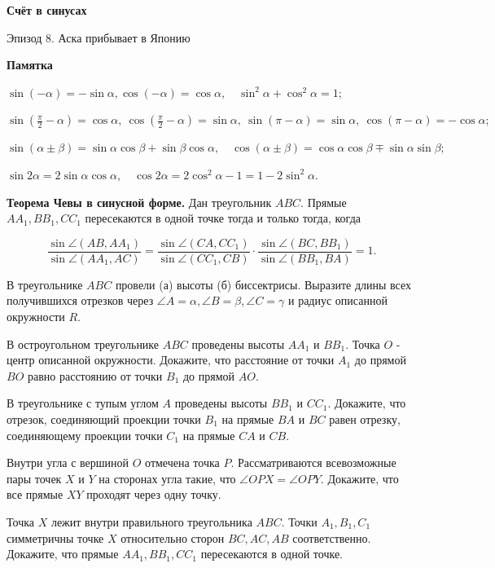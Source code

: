 \centerline{\bf \Huge Счёт в синусах}

\begin{flushright}
        \scriptsize{Эпизод 8. Аска прибывает в Японию}
\end{flushright}

\textbf{Памятка}

$\sin (-\alpha)=-\sin \alpha, \cos (-\alpha)=\cos \alpha,\quad \sin ^2 \alpha+\cos ^2 \alpha=1$;

$\sin \left(\frac{\pi}{2}-\alpha\right)=\cos \alpha,\  \cos \left(\frac{\pi}{2}-\alpha\right)=\sin \alpha,\  \sin (\pi-\alpha)=\sin \alpha, \ \cos (\pi-\alpha)=-\cos \alpha ;$

$\sin (\alpha \pm \beta)=\sin \alpha \cos \beta+\sin \beta \cos \alpha,\quad \cos (\alpha \pm \beta)=\cos \alpha \cos \beta \mp \sin \alpha \sin \beta ;$ 

$\sin 2 \alpha=2 \sin \alpha \cos \alpha, \quad \cos 2 \alpha=2 \cos ^2 \alpha-1=1-2 \sin ^2 \alpha$.

\textbf{Теорема Чевы в синусной форме.} Дан треугольник $A B C$. Прямые $A A_1, B B_1, C C_1$ пересекаются в одной точке тогда и только тогда, когда

$$
\frac{\sin \angle\left(A B, A A_1\right)}{\sin \angle\left(A A_1, A C\right)}=\frac{\sin \angle\left(C A, C C_1\right)}{\sin \angle\left(C C_1, C B\right)} \cdot \frac{\sin \angle\left(B C, B B_1\right)}{\sin \angle\left(B B_1, B A\right)}=1 .
$$


В треугольнике $A B C$ провели (а) высоты (б) биссектрисы. Выразите длины всех получившихся отрезков через $\angle A=\alpha, \angle B=\beta, \angle C=\gamma$ и радиус описанной окружности $R$.

В остроугольном треугольнике $A B C$ проведены высоты $A A_1$ и $B B_1$. Точка $O$ - центр описанной окружности. Докажите, что расстояние от точки $A_1$ до прямой $B O$ равно расстоянию от точки $B_1$ до прямой $AO$.

В треугольнике с тупым углом $A$ проведены высоты $B B_1$ и $C C_1$. Докажите, что отрезок, соединяющий проекции точки $B_1$ на прямые $B A$ и $B C$ равен отрезку, соединяющему проекции точки $C_1$ на прямые $CA$ и $CB$.

Внутри угла с вершиной $O$ отмечена точка $P$. Рассматриваются всевозможные пары точек $X$ и $Y$ на сторонах угла такие, что $\angle O P X=\angle O P Y$. Докажите, что все прямые $X Y$ проходят через одну точку.

Точка $X$ лежит внутри правильного треугольника $A B C$. Точки $A_1, B_1, C_1$ симметричны точке $X$ относительно сторон $B C, A C, A B$ соответственно. Докажите, что прямые $A A_1, B B_1, C C_1$ пересекаются в одной точке.

